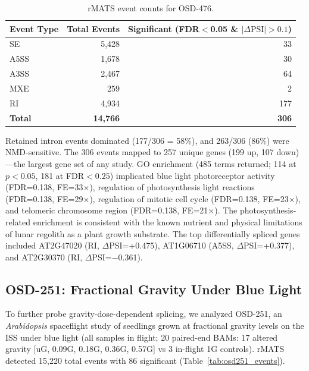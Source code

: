 \documentclass[12pt,a4paper]{article}
\begin{document}
\begin{table}[h]
\centering
\caption{rMATS event counts for OSD-476.}
\label{tab:osd476_events}
\begin{tabular}{lrr}
\toprule
\textbf{Event Type} & \textbf{Total Events} & \textbf{Significant (FDR$<$0.05 \& $|\Delta\text{PSI}|>0.1$)} \\
\midrule
SE & 5,428 & 33 \\
A5SS & 1,678 & 30 \\
A3SS & 2,467 & 64 \\
MXE & 259 & 2 \\
RI & 4,934 & 177 \\
\textbf{Total} & \textbf{14,766} & \textbf{306} \\
\bottomrule
\end{tabular}
\end{table}

Retained intron events dominated (177/306 = 58\%), and 263/306 (86\%) were NMD-sensitive. The 306 events mapped to 257 unique genes (199 up, 107 down)---the largest gene set of any study. GO enrichment (485 terms returned; 114 at $p<0.05$, 181 at FDR$<0.25$) implicated blue light photoreceptor activity (FDR=0.138, FE=33$\times$), regulation of photosynthesis light reactions (FDR=0.138, FE=29$\times$), regulation of mitotic cell cycle (FDR=0.138, FE=23$\times$), and telomeric chromosome region (FDR=0.138, FE=21$\times$). The photosynthesis-related enrichment is consistent with the known nutrient and physical limitations of lunar regolith as a plant growth substrate. The top differentially spliced genes included AT2G47020 (RI, $\Delta$PSI=+0.475), AT1G06710 (A5SS, $\Delta$PSI=+0.377), and AT2G30370 (RI, $\Delta$PSI=$-$0.361).

\subsection{OSD-251: Fractional Gravity Under Blue Light}

To further probe gravity-dose-dependent splicing, we analyzed OSD-251, an \textit{Arabidopsis} spaceflight study of seedlings grown at fractional gravity levels on the ISS under blue light (all samples in flight; 20 paired-end BAMs: 17 altered gravity [uG, 0.09G, 0.18G, 0.36G, 0.57G] vs 3 in-flight 1G controls). rMATS detected 15,220 total events with 86 significant (Table~\ref{tab:osd251_events}).
\end{document}
